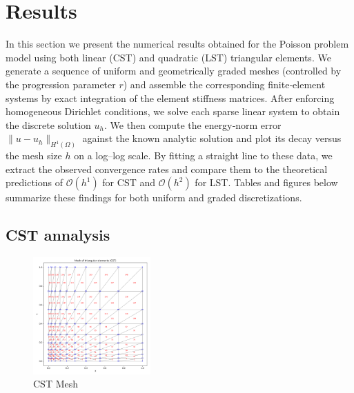 \section{Results}

In this section we present the numerical results obtained for the Poisson problem model using both linear (CST) and quadratic (LST) triangular elements. We generate a sequence of uniform and geometrically graded meshes (controlled by the progression parameter $r$) and assemble the corresponding finite‐element systems by exact integration of the element stiffness matrices. After enforcing homogeneous Dirichlet conditions, we solve each sparse linear system to obtain the discrete solution \(u_h\). We then compute the energy‐norm error \(\|u - u_h\|_{H^1(\Omega)}\) against the known analytic solution and plot its decay versus the mesh size \(h\) on a log–log scale. By fitting a straight line to these data, we extract the observed convergence rates and compare them to the theoretical predictions of \(\mathcal{O}(h^1)\) for CST and \(\mathcal{O}(h^2)\) for LST. Tables and figures below summarize these findings for both uniform and graded discretizations.  

\subsection{CST annalysis}

\begin{figure}[H]
\centering
\includegraphics[width=0.4\textwidth]{GRAFICOS/CST/CST_mesh_plot.png}
\caption{CST Mesh}
\label{fig:cst_results}
\end{figure}

